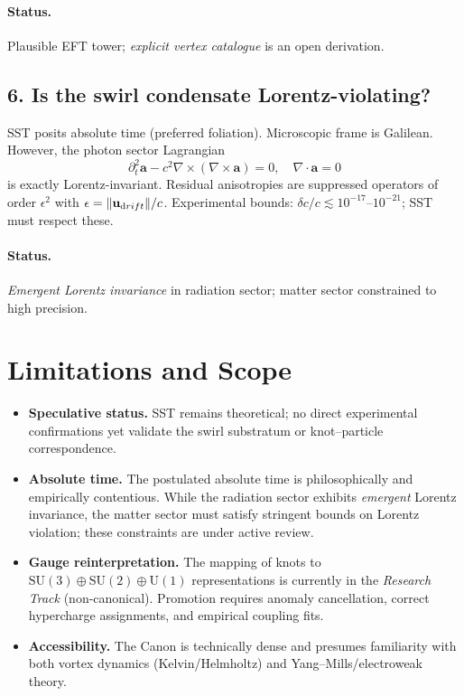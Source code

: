\documentclass[11pt]{article}
\begin{document}
\paragraph{Status.} Plausible EFT tower; \emph{explicit vertex catalogue} is an open derivation.

\subsection*{6. Is the swirl condensate Lorentz-violating?}
SST posits absolute time (preferred foliation). Microscopic frame is Galilean.
However, the photon sector Lagrangian
\[
    \partial_t^2 \mathbf a - c^2 \nabla\times(\nabla\times \mathbf a)=0,\quad \nabla\cdot\mathbf a=0
\]
is exactly Lorentz-invariant. Residual anisotropies are suppressed operators of order $\epsilon^2$ with $\epsilon=\|\mathbf u_{\textrm drift}\|/c$.
Experimental bounds: $\delta c/c \lesssim 10^{-17}$--$10^{-21}$; SST must respect these.

\paragraph{Status.} \emph{Emergent Lorentz invariance} in radiation sector; matter sector constrained to high precision.


\section{Limitations and Scope}
\label{sec:limitations}

\begin{tcolorbox}[colback=yellow!6!white,colframe=yellow!40!black,title={\Large\warning~ Limitations}]
	\begin{itemize}
		\item \textbf{Speculative status.} SST remains theoretical; no direct experimental confirmations yet validate the swirl substratum or knot–particle correspondence.
		\item \textbf{Absolute time.} The postulated absolute time is philosophically and empirically contentious. While the radiation sector exhibits \emph{emergent} Lorentz invariance, the matter sector must satisfy stringent bounds on Lorentz violation; these constraints are under active review.
		\item \textbf{Gauge reinterpretation.} The mapping of knots to \(\mathrm{SU}(3)\oplus\mathrm{SU}(2)\oplus\mathrm{U}(1)\) representations is currently in the \emph{Research Track} (non-canonical). Promotion requires anomaly cancellation, correct hypercharge assignments, and empirical coupling fits.
		\item \textbf{Accessibility.} The Canon is technically dense and presumes familiarity with both vortex dynamics (Kelvin/Helmholtz) and Yang–Mills/electroweak theory.
	\end{itemize}
\end{tcolorbox}
\end{document}
